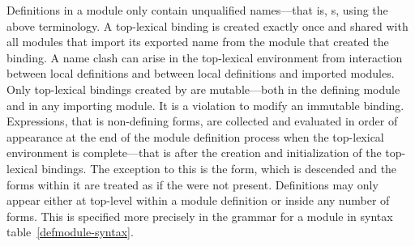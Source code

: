 %
\begin{optDefinition}
Definitions in a module only contain unqualified names---that is,
s, using the above terminology.  A top-lexical binding is created
exactly once and shared with all modules that import its exported name from the
module that created the binding.  A name clash can arise in the top-lexical
environment from interaction between local definitions and between local
definitions and imported modules.  Only top-lexical bindings created by
 are mutable---both in the defining module and in any
importing module.  It is a violation to modify an immutable binding.
Expressions, that is non-defining forms, are collected and evaluated in order of
appearance at the end of the module definition process when the top-lexical
environment is complete---that is after the creation and initialization of the
top-lexical bindings.  The exception to this is the  form,
which is descended and the forms within it are treated as if the
 were not present.  Definitions may only appear either at
top-level within a module definition or inside any number of 
forms.  This is specified more precisely in the grammar for a module in syntax
table~\ref{defmodule-syntax}.
%
\end{optDefinition}

